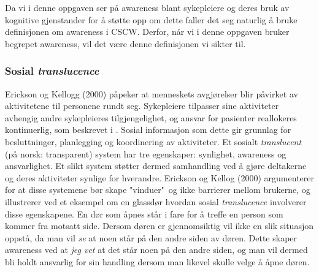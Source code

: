 \noindent
Da vi i denne oppgaven ser på awareness blant sykepleiere og deres bruk av kognitive gjenstander for å støtte opp om dette faller det seg naturlig å bruke definisjonen om awareness i CSCW. Derfor, når vi i denne oppgaven bruker begrepet awareness, vil det være denne definisjonen vi sikter til.

\subsubsection{Sosial \emph{translucence}}
Erickson og Kellogg (2000) \nocite{Erickson00} påpeker at menneskets avgjørelser blir påvirket av aktivitetene til personene rundt seg. Sykepleiere tilpasser sine aktiviteter avhengig andre sykepleieres tilgjengelighet, og ansvar for pasienter reallokeres kontinuerlig, som beskrevet i \cite{KlemetsRedundancy}. Sosial informasjon som dette gir grunnlag for besluttninger, planlegging og koordinering av aktiviteter. Et sosialt \emph{translucent} (på norsk: transparent) system har tre egenskaper: synlighet, awareness og ansvarlighet. Et slikt system støtter dermed samhandling ved å gjøre deltakerne og deres aktiviteter synlige for hverandre. Erickson og Kellog (2000) argumenterer for at disse systemene bør skape "vinduer"\ og ikke barrierer mellom brukerne, og illustrerer ved et eksempel om en glassdør hvordan sosial \emph{translucence} involverer disse egenskapene. En dør som åpnes står i fare for å treffe en person som kommer fra motsatt side. Dersom døren er gjennomsiktig vil ikke en slik situasjon oppstå, da man vil \emph{se} at noen står på den andre siden av døren. Dette skaper awareness ved at \emph{jeg vet} at det står noen på den andre siden, og man vil dermed bli holdt ansvarlig for sin handling dersom man likevel skulle velge å åpne døren.